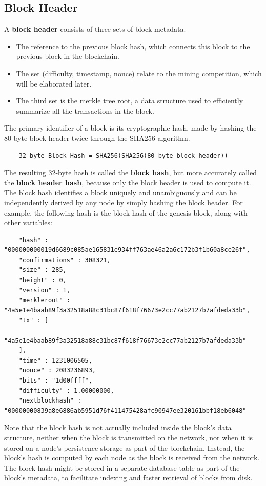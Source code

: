\documentclass{article}
\begin{document}
  \subsection{Block Header}

    A \textbf{block header} consists of three sets of block metadata.
    \begin{itemize}
      \item The reference to the previous block hash, which connects this block to the previous block in the blockchain.
      \item The set (difficulty, timestamp, nonce) relate to the mining competition, which will be elaborated later.
      \item The third set is the merkle tree root, a data structure used to efficiently summarize all the transactions in the block.
    \end{itemize}

    The primary identifier of a block is its cryptographic hash, made by hashing the 80-byte block header twice through the SHA256 algorithm.

    \begin{lstlisting}
    32-byte Block Hash = SHA256(SHA256(80-byte block header))
    \end{lstlisting}

    The resulting 32-byte hash is called the \textbf{block hash}, but more accurately called the \textbf{block header hash}, because only the block header is used to compute it. The block hash identifies a block uniquely and unambiguously and can be independently derived by any node by simply hashing the block header. For example, the following hash is the block hash of the genesis block, along with other variables:

    \begin{lstlisting}
    "hash" : "000000000019d6689c085ae165831e934ff763ae46a2a6c172b3f1b60a8ce26f",
    "confirmations" : 308321,
    "size" : 285,
    "height" : 0,
    "version" : 1,
    "merkleroot" : "4a5e1e4baab89f3a32518a88c31bc87f618f76673e2cc77ab2127b7afdeda33b",
    "tx" : [
        "4a5e1e4baab89f3a32518a88c31bc87f618f76673e2cc77ab2127b7afdeda33b"
    ],
    "time" : 1231006505,
    "nonce" : 2083236893,
    "bits" : "1d00ffff",
    "difficulty" : 1.00000000,
    "nextblockhash" : "00000000839a8e6886ab5951d76f411475428afc90947ee320161bbf18eb6048"
    \end{lstlisting}

    Note that the block hash is not actually included inside the block's data structure, neither when the block is transmitted on the network, nor when it is stored on a node's persistence storage as part of the blockchain. Instead, the block's hash is computed by each node as the block is received from the network. The block hash might be stored in a separate database table as part of the block's metadata, to facilitate indexing and faster retrieval of blocks from disk.
\end{document}
